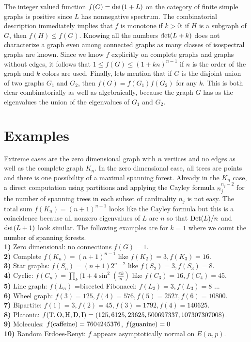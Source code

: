 \documentclass[12pt]{amsart}
\theoremstyle{definition}
\begin{document}
The integer valued function $f(G) = {{\rm det}}(1+L)$ on the category of finite simple graphs is positive since
$L$ has nonnegative spectrum. The combinatorial description immediately implies that $f$ is monotone
if $k>0$: if $H$ is a subgraph of $G$, then $f(H) \leq f(G)$. 
Knowing all the numbers ${{\rm det}}(L+k)$ does not characterize a graph even among connected graphs 
as many classes of isospectral graphs are known. 
Since we know $f$ explicitly on complete graphs and graphs without edges,
it follows that $1 \leq f(G) \leq (1+k n)^{n-1}$ if $n$ is the order of the graph and
$k$ colors are used.  Finally, lets mention that if $G$ is the disjoint union of two 
graphs $G_1$ and $G_2$, then $f(G) = f(G_1) f(G_2)$ for any $k$. This is both clear combinatorially
as well as algebraically, because the graph $G$ has as the eigenvalues the union of the eigenvalues
of $G_1$ and $G_2$. 

\section{Examples}

Extreme cases are the zero dimensional graph with $n$ vertices and no edges as well as the 
complete graph $K_n$. In the zero dimensional case, all trees are points and there is one
possibility of a maximal spanning forest. Already in the $K_n$ case, a direct computation
using partitions and applying the Cayley formula $n_j^{n_j-2}$ for the number of spanning 
trees in each subset of cardinality $n_j$ is not easy. The total sum $f(K_n) = (n+1)^{n-1}$
looks like the Cayley formula but this is a coincidence because all nonzero eigenvalues 
of $L$ are $n$ so that ${\rm{Det}}(L)/n$ and ${{\rm det}}(L+1)$ look similar. The following examples
are for $k=1$ where we count the number of spanning forests. \\

{\bf 1)} Zero dimensional: no connections $f(G) = 1$. \\
{\bf 2)} Complete $f(K_n) = (n+1)^{n-1}$ like $f(K_2)=3,f(K_3)=16$. \\
{\bf 3)} Star graphs: $f(S_n) = (n+1) 2^{n-2}$ like $f(S_2)=3, f(S_3)=8$. \\
{\bf 4)} Cyclic: $f(C_n) = \prod_k (1+4 \sin^2(\frac{\pi k}{n})$ like $f(C_3)=16, f(C_4)=45$. \\
{\bf 5)} Line graph: $f(L_n)$ =bisected Fibonacci: $f(L_2)=3,f(L_3)=8$ ...\\
{\bf 6)} Wheel graph:  $f(3)=125,f(4)=576,f(5)=2527,f(6)=10800$. \\ 
{\bf 7)} Bipartite: $f(1)=3,f(2)=45,f(3)=1792,f(4)=140625$. \\
{\bf 8)} Platonic: $f({\rm T,O,H,D,I})=(125, 6125, 23625, 500697337, 107307307008)$. \\
{\bf 9)} Molecules: $f({\rm caffeine}) =7604245376$, $f({\rm guanine}) = 0$ \\
{\bf 10)} Random Erdoes-Renyi: $f$ appears asymptotically normal on $E(n,p)$. \\
\end{document}
